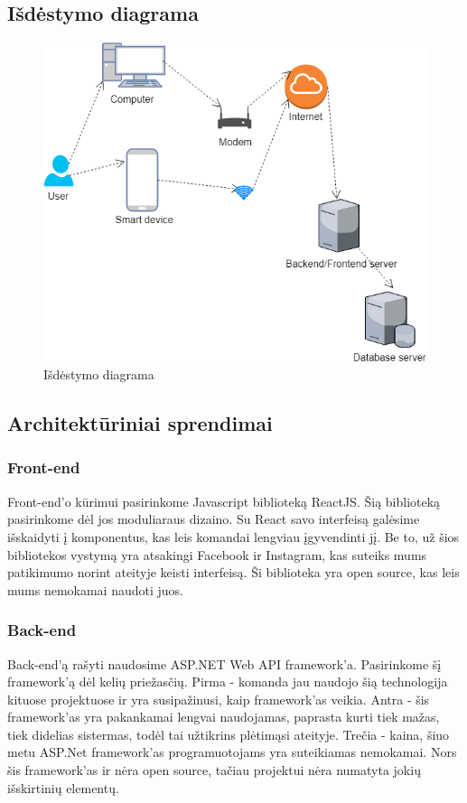 \documentclass[oneside]{VUMIFPSkursinis}
\begin{document}
\subsection{Išdėstymo diagrama}
	\begin{figure}[h]
    \centering
    \includegraphics[width=1.0\textwidth]{Deployment.png}
    \caption{Išdėstymo diagrama}
    \label{fig:domainfixed}
\end{figure}
\pagebreak
\subsection{Architektūriniai sprendimai}
\subsubsection{Front-end} Front-end'o kūrimui pasirinkome Javascript biblioteką ReactJS. Šią biblioteką pasirinkome dėl jos moduliaraus dizaino. Su React savo interfeisą galėsime išskaidyti į komponentus, kas leis komandai lengviau įgyvendinti jį. Be to, už šios bibliotekos vystymą yra atsakingi Facebook ir Instagram, kas suteiks mums patikimumo norint ateityje keisti interfeisą. Ši biblioteka yra open source, kas leis mums nemokamai naudoti juos.
\subsubsection{Back-end} Back-end'ą rašyti naudosime ASP.NET Web API framework'a. Pasirinkome šį framework'ą dėl kelių priežasčių. Pirma - komanda jau naudojo šią technologija kituose projektuose ir yra susipažinusi, kaip framework'as veikia. Antra - šis framework'as yra pakankamai lengvai naudojamas, paprasta kurti tiek mažas, tiek didelias sistermas, todėl tai užtikrins plėtimąsi ateityje. Trečia - kaina, šiuo metu ASP.Net framework'as programuotojams yra suteikiamas nemokamai. Nors šis framework'as ir nėra open source, tačiau projektui nėra numatyta jokių išskirtinių elementų.
\end{document}
